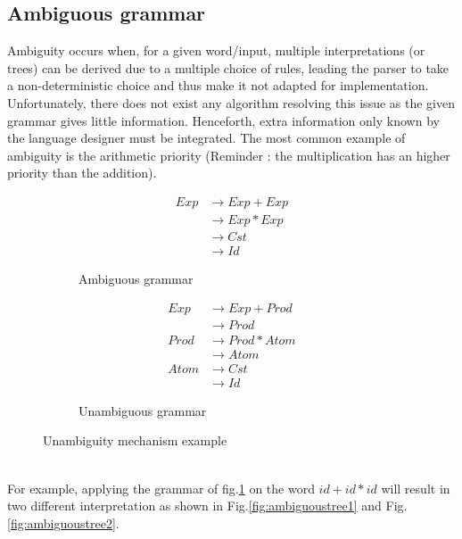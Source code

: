 \documentclass[a4paper,11pt]{article}
\begin{document}
  \subsection{Ambiguous grammar}
    \label{sec:ambiguity}
    Ambiguity occurs when, for a given word/input, multiple interpretations (or trees) can be derived due to a multiple choice of rules, leading the parser to take a non-deterministic choice and thus make it not adapted for implementation. Unfortunately, there does not exist any algorithm resolving this issue as the given grammar gives little information. Henceforth, extra information only known by the language designer must be integrated. The most common example of ambiguity is the arithmetic priority (Reminder : the multiplication has an higher priority than the addition).
      \begin{figure}[h!]
	\centering
	\begin{subfigure}[b]{0.4\textwidth}
	    \centering
	    \begin{align}
	      Exp &\rightarrow Exp+Exp \\
		  &\rightarrow Exp*Exp \\
		  &\rightarrow Cst \\
		  &\rightarrow Id
	    \end{align}
	    \caption{Ambiguous grammar}
	    \label{fig:unmodifiedgrammar3}
	\end{subfigure}%
	\begin{subfigure}[b]{0.4\textwidth}
	    \centering
	    \begin{align}
	      Exp  &\rightarrow Exp+Prod \\
		    &\rightarrow Prod \\
	      Prod &\rightarrow Prod*Atom \\
		    &\rightarrow Atom \\
	      Atom &\rightarrow Cst \\
		    &\rightarrow Id
	    \end{align}
	    \caption{Unambiguous grammar}
	    \label{fig:unambiguousgrammar3}
	\end{subfigure}
	\caption{Unambiguity mechanism example}
    \end{figure}\\
    For example, applying the grammar of fig.\ref{fig:unmodifiedgrammar3} on the word $id+id*id$ will result in two different interpretation as shown in Fig.\ref{fig:ambiguoustree1} and Fig.\ref{fig:ambiguoustree2}.
\end{document}
